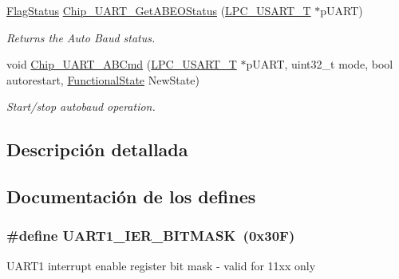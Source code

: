 \begin{DoxyCompactItemize}
\hyperlink{group___l_p_c___types___public___types_ga89136caac2e14c55151f527ac02daaff}{Flag\+Status} \hyperlink{group___u_a_r_t__18_x_x__43_x_x_ga6d1d74a73290b145868a88e6b5635093}{Chip\+\_\+\+U\+A\+R\+T\+\_\+\+Get\+A\+B\+E\+O\+Status} (\hyperlink{struct_l_p_c___u_s_a_r_t___t}{L\+P\+C\+\_\+\+U\+S\+A\+R\+T\+\_\+T} $\ast$p\+U\+A\+RT)
\begin{DoxyCompactList}\small\item\em Returns the Auto Baud status. \end{DoxyCompactList}\item 
void \hyperlink{group___u_a_r_t__18_x_x__43_x_x_ga9aa733f176891043bb1dd4d87940187f}{Chip\+\_\+\+U\+A\+R\+T\+\_\+\+A\+B\+Cmd} (\hyperlink{struct_l_p_c___u_s_a_r_t___t}{L\+P\+C\+\_\+\+U\+S\+A\+R\+T\+\_\+T} $\ast$p\+U\+A\+RT, uint32\+\_\+t mode, bool autorestart, \hyperlink{group___l_p_c___types___public___types_gac9a7e9a35d2513ec15c3b537aaa4fba1}{Functional\+State} New\+State)
\begin{DoxyCompactList}\small\item\em Start/stop autobaud operation. \end{DoxyCompactList}\end{DoxyCompactItemize}


\subsection{Descripción detallada}


\subsection{Documentación de los \textquotesingle{}defines\textquotesingle{}}
\subsubsection[{\texorpdfstring{U\+A\+R\+T1\+\_\+\+I\+E\+R\+\_\+\+B\+I\+T\+M\+A\+SK}{UART1_IER_BITMASK}}]{\setlength{\rightskip}{0pt plus 5cm}\#define U\+A\+R\+T1\+\_\+\+I\+E\+R\+\_\+\+B\+I\+T\+M\+A\+SK~(0x30\+F)}\hypertarget{group___u_a_r_t__18_x_x__43_x_x_ga145046fd9bd1d318acffd4770a7432ec}{}\label{group___u_a_r_t__18_x_x__43_x_x_ga145046fd9bd1d318acffd4770a7432ec}
U\+A\+R\+T1 interrupt enable register bit mask -\/ valid for 11xx only 

